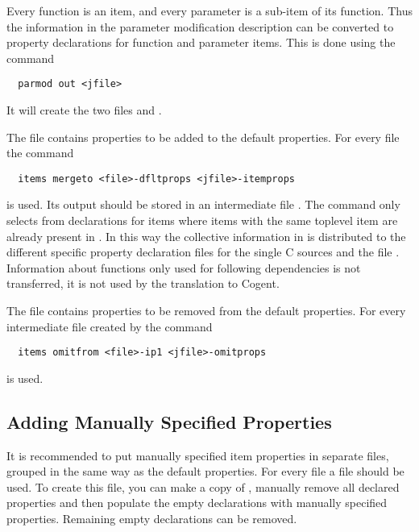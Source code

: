 Every function is an item, and every parameter is a sub-item of its function. Thus the information in the parameter modification
description can be converted to property declarations for function and parameter items. This is done using the command
\begin{verbatim}
  parmod out <jfile>
\end{verbatim}
It will create the two files  and . 

The file  contains properties to be added to the default properties. For every file 
the command 
\begin{verbatim}
  items mergeto <file>-dfltprops <jfile>-itemprops
\end{verbatim}
is used. Its output should be stored in an intermediate file . The command only selects from 
 declarations for items where items with the same toplevel item are already present in
. In this way the collective information in  is distributed to the different
specific property declaration files for the single C sources and the file . Information about functions
only used for following dependencies is not transferred, it is not used by the translation to Cogent.

The file  contains properties to be removed from the default properties. For every intermediate file
 created by  the command 
\begin{verbatim}
  items omitfrom <file>-ip1 <jfile>-omitprops
\end{verbatim}
is used. 

\subsection{Adding Manually Specified Properties}
\label{app-itemprops-manual}

It is recommended to put manually specified item properties in separate files, grouped in the same way as the default 
properties. For every file  a file  should be used. To create this file,
you can make a copy of , manually remove all declared properties and then populate the empty
declarations with manually specified properties. Remaining empty declarations can be removed.

